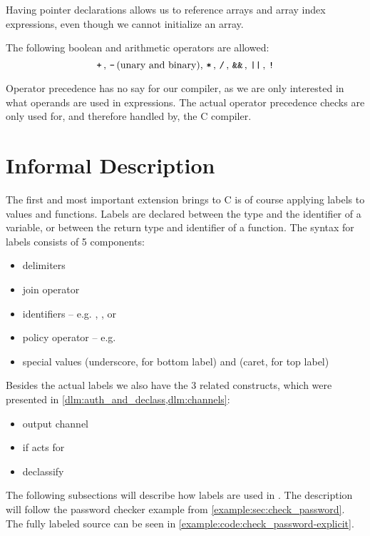 Having pointer declarations allows us to reference arrays and array index expressions, even though we cannot initialize an array.

The following boolean and arithmetic operators are allowed:
\[ \, \texttt{+} \,, \, \texttt{-} \, \text{(unary and binary)}, \, \texttt{*} \,, \, \texttt{/} \,, \, \texttt{\&\&} \,, \, \texttt{||} \,, \, \texttt{!} \, \]

Operator precedence has no say for our compiler, as we are only interested in what operands are used in expressions.
The actual operator precedence checks are only used for, and therefore handled by, the C compiler.

\section{Informal Description}
The first and most important extension \thelang{} brings to C is of course applying labels to values and functions.
Labels are declared between the type and the identifier of a variable, or between the return type and identifier of a function.
The syntax for labels consists of 5 components:
\begin{itemize}
  \item delimiters \dlmc{\{\{ \}\}}
  \item join operator \dlmc{;}
  \item identifiers -- e.g. , , or 
  \item policy operator \dlmc{->} -- e.g. 
  \item special values \dlmc{_} (underscore, for bottom label) and \dlmc{^} (caret, for top label)
\end{itemize}

Besides the actual labels we also have the 3 related constructs, which were presented in \cref{dlm:auth_and_declass,dlm:channels}:
\begin{itemize}
  \item output channel 
  \item if acts for 
  \item declassify 
\end{itemize}

The following subsections will describe how labels are used in \thelang.
The description will follow the password checker example from \cref{example:sec:check_password}.
The fully labeled source can be seen in \cref{example:code:check_password-explicit}.

